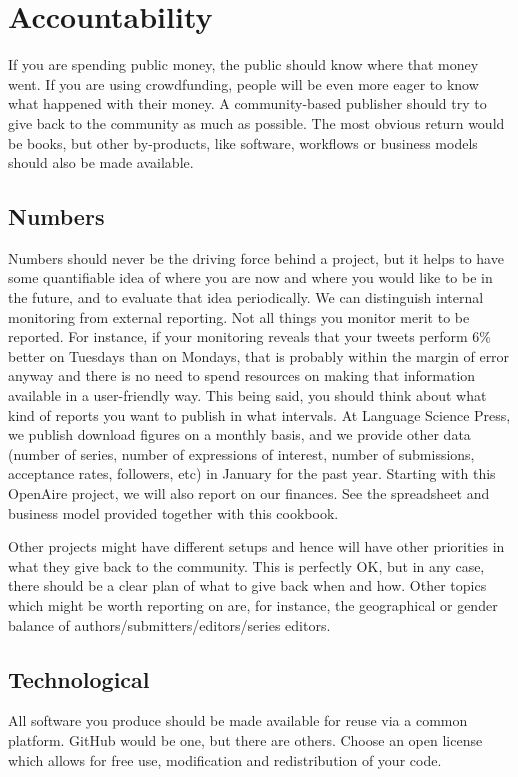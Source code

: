 \documentclass[nonflat,modfonts,output=book] {langsci/langscibook}
\begin{document}
            
\section{Accountability}\label{sec:accountability}
If you are spending public money, the public should know where that money went. If you are using crowdfunding, people will be even more eager to know what happened with their money. A community-based publisher should try to give back to the community as much as possible. The most obvious return would be books, but other by-products, like software, workflows or business models should also be made available. 

\subsection{Numbers}
Numbers should never be the driving force behind a project, but it helps to have some quantifiable idea of where you are now and where you would like to be in the future, and to evaluate that idea periodically. We can distinguish internal monitoring from external reporting. Not all things you monitor merit to be reported. For instance, if your monitoring reveals that your tweets perform 6\% better on Tuesdays than on Mondays, that is probably within the margin of error anyway and there is no need to spend resources on making that information available in a user-friendly way. This being said, you should think about what kind of reports you want to publish in what intervals. At Language Science Press, we publish download figures on a monthly basis, and we provide other data (number of series, number of expressions of interest, number of submissions, acceptance rates, followers, etc) in January for the past year. Starting with this Open\-Aire project, we will also report on our finances. See the spreadsheet and business model provided together with this cookbook.

Other projects might have different setups and hence will have other priorities in what they give back to the community. This is perfectly OK, but in any case, there should be a clear plan of what to give back when and how. Other topics which might be worth reporting on are, for instance, the geographical or gender balance of authors/submitters/editors/series editors.


\subsection{Technological}
All software you produce should be made available for reuse via a common platform. GitHub would be one, but there are others. Choose an open license which allows for free use, modification and redistribution of your code. 
\end{document}
